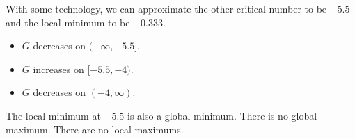 \documentclass{ximera}
\begin{document}
\begin{example}
With some technology, we can approximate the other critical number to be $-5.5$ and the local minimum to be $-0.333$.




\begin{center}
\end{center}







\begin{itemize}
\item $G$ decreases on $(-\infty, -5.5]$.
\item $G$ increases on $[-5.5, -4)$.
\item $G$ decreases on $(-4, \infty)$.
\end{itemize}



The local minimum at $-5.5$ is also a global minimum.  There is no global maximum.  There are no local maximums.



\end{example}
\end{document}
